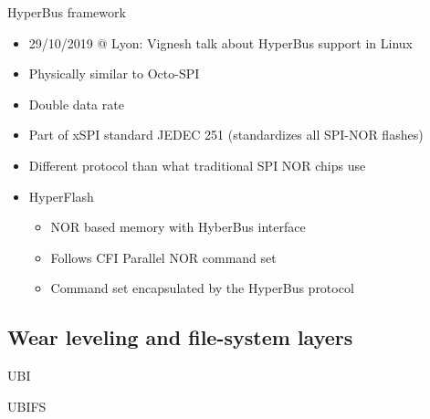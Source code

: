 \documentclass[aspectratio=169,obeyspaces,spaces,hyphens,dvipsnames]{beamer}
\begin{document}
\begin{frame}{HyperBus framework}
  \begin{itemize}
  \item 29/10/2019 @ Lyon: Vignesh talk about HyperBus support in Linux
    \vfill
  \item Physically similar to Octo-SPI
  \item Double data rate
  \item Part of xSPI standard JEDEC 251 (standardizes all SPI-NOR
    flashes)
  \item Different protocol than what traditional SPI NOR chips use
    \vfill
  \item HyperFlash
    \begin{itemize}
    \item NOR based memory with HyberBus interface
    \item Follows CFI Parallel NOR command set\\
    \item Command set encapsulated by the HyperBus protocol
    \end{itemize}
  \end{itemize}
\end{frame}

\subsection{Wear leveling and file-system layers}

\begin{frame}{UBI}
\end{frame}

\begin{frame}{UBIFS}
\end{frame}
\end{document}
